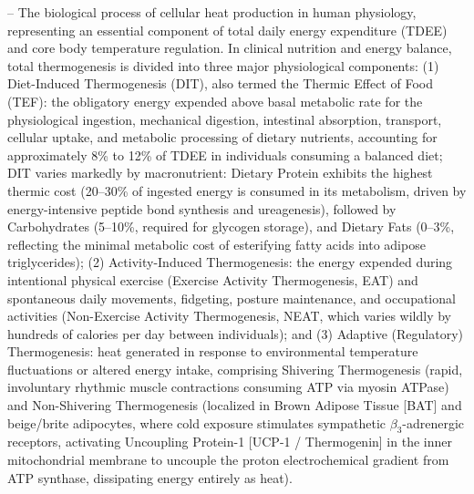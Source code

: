 -- The biological process of cellular heat production in human physiology, representing an essential component of total daily energy expenditure (TDEE) and core body temperature regulation. In clinical nutrition and energy balance, total thermogenesis is divided into three major physiological components: (1) Diet-Induced Thermogenesis (DIT), also termed the Thermic Effect of Food (TEF): the obligatory energy expended above basal metabolic rate for the physiological ingestion, mechanical digestion, intestinal absorption, transport, cellular uptake, and metabolic processing of dietary nutrients, accounting for approximately 8\% to 12\% of TDEE in individuals consuming a balanced diet; DIT varies markedly by macronutrient: Dietary Protein exhibits the highest thermic cost (20--30\% of ingested energy is consumed in its metabolism, driven by energy-intensive peptide bond synthesis and ureagenesis), followed by Carbohydrates (5--10\%, required for glycogen storage), and Dietary Fats (0--3\%, reflecting the minimal metabolic cost of esterifying fatty acids into adipose triglycerides); (2) Activity-Induced Thermogenesis: the energy expended during intentional physical exercise (Exercise Activity Thermogenesis, EAT) and spontaneous daily movements, fidgeting, posture maintenance, and occupational activities (Non-Exercise Activity Thermogenesis, NEAT, which varies wildly by hundreds of calories per day between individuals); and (3) Adaptive (Regulatory) Thermogenesis: heat generated in response to environmental temperature fluctuations or altered energy intake, comprising Shivering Thermogenesis (rapid, involuntary rhythmic muscle contractions consuming ATP via myosin ATPase) and Non-Shivering Thermogenesis (localized in Brown Adipose Tissue [BAT] and beige/brite adipocytes, where cold exposure stimulates sympathetic $\beta_3$-adrenergic receptors, activating Uncoupling Protein-1 [UCP-1 / Thermogenin] in the inner mitochondrial membrane to uncouple the proton electrochemical gradient from ATP synthase, dissipating energy entirely as heat).


